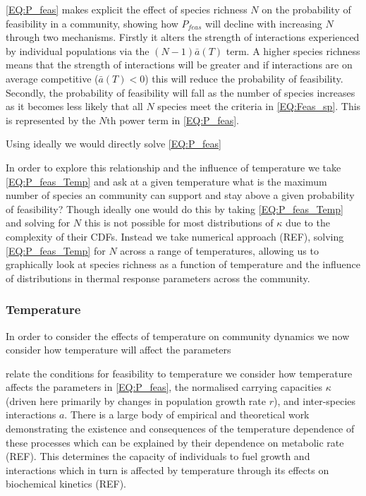 \documentclass{article}
\begin{document}
\cref{EQ:P_feas} makes explicit the effect of species richness $N$ on the probability of feasibility in a community, showing how $P_{feas}$ will decline with increasing $N$ through two mechanisms. Firstly it alters the strength of interactions experienced by individual populations via the $(N-1) \bar{a}(T)$ term. A higher species richness means that the strength of interactions will be greater and if interactions are on average competitive ($\bar{a}(T) < 0$) this will reduce the probability of feasibility. Secondly, the probability of feasibility will fall as the number of species increases as it becomes less likely that all $N$ species meet the criteria in \cref{EQ:Feas_sp}. This is represented by the $N\text{th}$ power term in \cref{EQ:P_feas}.

Using  ideally we would directly solve \cref{EQ:P_feas}  

In order to explore this relationship and the influence of temperature we take \cref{EQ:P_feas_Temp} and ask at a given temperature what is the maximum number of species an community can support and stay above a given probability of feasibility? Though ideally one would do this by taking \cref{EQ:P_feas_Temp} and solving for $N$ this is not possible for most distributions of $\kappa$ due to the complexity of their CDFs. Instead we take numerical approach (REF), solving \cref{EQ:P_feas_Temp}  for $N$ across a range of temperatures, allowing us to graphically look at species richness as a function of temperature and the influence of distributions in thermal response parameters across the community.

\subsubsection{Temperature} \label{SEC:Temperature}
In order to consider the effects of temperature on community dynamics we now consider how temperature will affect the parameters 

relate the conditions for feasibility to temperature we consider how temperature affects the parameters in \cref{EQ:P_feas}, the normalised carrying capacities $\kappa$ (driven here primarily by changes in population growth rate $r$), and inter-species interactions $a$. There is a large body of empirical and theoretical work demonstrating the existence and consequences of the temperature dependence of these processes which can be explained by their dependence on metabolic rate (REF). This determines the capacity of individuals to fuel growth and interactions which in turn is affected by temperature through its effects on biochemical kinetics (REF).
\end{document}
